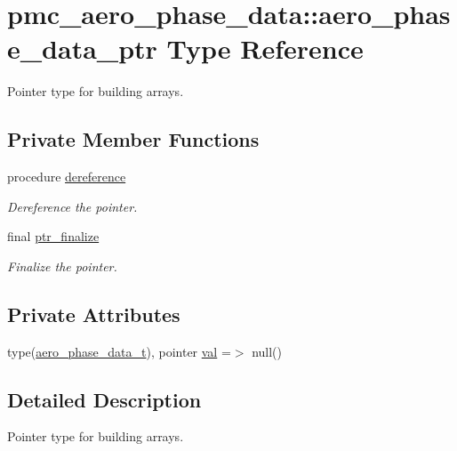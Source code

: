 \hypertarget{structpmc__aero__phase__data_1_1aero__phase__data__ptr}{}\section{pmc\+\_\+aero\+\_\+phase\+\_\+data\+:\+:aero\+\_\+phase\+\_\+data\+\_\+ptr Type Reference}
\label{structpmc__aero__phase__data_1_1aero__phase__data__ptr}


Pointer type for building arrays.  


\subsection*{Private Member Functions}
\begin{DoxyCompactItemize}
\item 
procedure \mbox{\hyperlink{structpmc__aero__phase__data_1_1aero__phase__data__ptr_a9fb4cdf71fb45268be803c0f0e253df1}{dereference}}
\begin{DoxyCompactList}\small\item\em Dereference the pointer. \end{DoxyCompactList}\item 
final \mbox{\hyperlink{structpmc__aero__phase__data_1_1aero__phase__data__ptr_a1cde167e130d1a0081c338f3ce614356}{ptr\+\_\+finalize}}
\begin{DoxyCompactList}\small\item\em Finalize the pointer. \end{DoxyCompactList}\end{DoxyCompactItemize}
\subsection*{Private Attributes}
\begin{DoxyCompactItemize}
\item 
type(\mbox{\hyperlink{structpmc__aero__phase__data_1_1aero__phase__data__t}{aero\+\_\+phase\+\_\+data\+\_\+t}}), pointer \mbox{\hyperlink{structpmc__aero__phase__data_1_1aero__phase__data__ptr_a6ab8ed4ed9263f0d5f648001a0100841}{val}} =$>$ null()
\end{DoxyCompactItemize}


\subsection{Detailed Description}
Pointer type for building arrays. 

